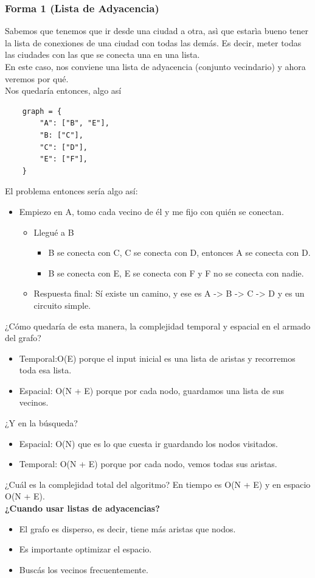 \documentclass[10pt,a4paper]{article}
\begin{document}
\subsubsection*{Forma 1 (Lista de Adyacencia)}
Sabemos que tenemos que ir desde una ciudad a otra, asì que estarìa bueno tener la lista de conexiones de una ciudad con todas las demás. Es decir, meter todas las ciudades con las que se conecta una en una lista. \\
En este caso, nos conviene una lista de adyacencia (conjunto vecindario) y ahora veremos por qué.\\
Nos quedaría entonces, algo así 
\begin{lstlisting}
    graph = {
        "A": ["B", "E"],
        "B: ["C"],
        "C": ["D"],
        "E": ["F"],
    }
\end{lstlisting}
El problema entonces sería algo así: 
\begin{itemize}
    \item Empiezo en A, tomo cada vecino de él y me fijo con quién se conectan.
    \begin{itemize}
        \item Llegué a B
        \begin{itemize}
            \item B se conecta con C, C se conecta con D, entonces A se conecta con D. 
            \item B se conecta con E, E se conecta con F y F no se conecta con nadie.
        \end{itemize}
        \item Respuesta final: Sí existe un camino, y ese es A -> B -> C -> D y es un circuito simple.
    \end{itemize}
\end{itemize}
¿Cómo quedaría de esta manera, la complejidad temporal y espacial en el armado del grafo? 
\begin{itemize}
    \item Temporal:O(E) porque el input inicial es una lista de aristas y recorremos toda esa lista.
    \item Espacial: O(N + E) porque por cada nodo, guardamos una lista de sus vecinos.
\end{itemize}
¿Y en la búsqueda? 
\begin{itemize}
    \item Espacial: O(N) que es lo que cuesta ir guardando los nodos visitados. 
    \item Temporal: O(N + E) porque por cada nodo, vemos todas sus aristas.
\end{itemize}
¿Cuál es la complejidad total del algoritmo? En tiempo es O(N + E) y en espacio O(N + E). \\
\textbf{¿Cuando usar listas de adyacencias?}
\begin{itemize}
    \item El grafo es disperso, es decir, tiene más aristas que nodos.
    \item Es importante optimizar el espacio.
    \item Buscás los vecinos frecuentemente.
\end{itemize}
\end{document}
